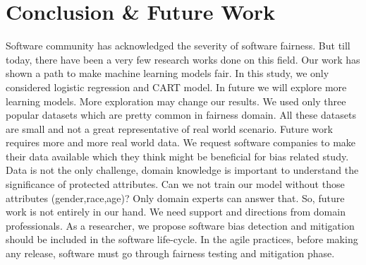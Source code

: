 \documentclass[10pt,conference]{IEEEtran}
\begin{document}
\section{Conclusion \& Future Work} Software community has acknowledged the severity of software fairness. But till today, there have been a very few research works done on this field. Our work has shown a path to make machine learning models fair. In this study, we only considered logistic regression and CART model. In future we will explore more learning models. More exploration may change our results. We used only three popular datasets which are pretty common in fairness domain. All these datasets are small and not a great representative of real world scenario. Future work requires more and more real world data. We request software companies to make their data available which they think might be beneficial for bias related study. Data is not the only challenge,  domain knowledge is important to understand the significance of protected attributes. Can we not train our model without those attributes (gender,race,age)? Only domain experts can answer that. So, future work is not entirely in our hand. We need support and directions from domain professionals. As a researcher, we propose software bias detection and mitigation should be included in the software life-cycle. In the agile practices, before making any release, software must go through fairness testing and mitigation phase. 





\end{document}
